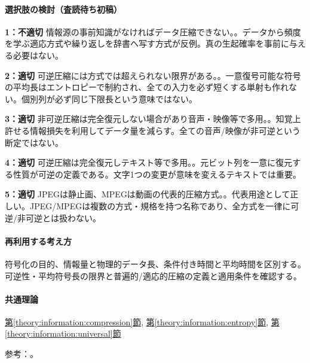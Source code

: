 \paragraph{選択肢の検討（査読待ち初稿）}\mbox{}\par

\noindent\textbf{1：不適切} 情報源の事前知識がなければデータ圧縮できない。。データから頻度を学ぶ適応方式や繰り返しを辞書へ写す方式が反例。真の生起確率を事前に与える必要はない。\par

\noindent\textbf{2：適切} 可逆圧縮には方式では超えられない限界がある。。一意復号可能な符号の平均長はエントロピーで制約され、全ての入力を必ず短くする単射も作れない。個別列が必ず同じ下限長という意味ではない。\par

\noindent\textbf{3：適切} 非可逆圧縮は完全復元しない場合があり音声・映像等で多用。。知覚上許せる情報損失を利用してデータ量を減らす。全ての音声/映像が非可逆という断定ではない。\par

\noindent\textbf{4：適切} 可逆圧縮は完全復元しテキスト等で多用。。元ビット列を一意に復元する性質が可逆の定義である。文字1つの変更が意味を変えるテキストでは重要。\par

\noindent\textbf{5：適切} JPEGは静止画、MPEGは動画の代表的圧縮方式。。代表用途として正しい。JPEG/MPEGは複数の方式・規格を持つ名称であり、全方式を一律に可逆/非可逆とは扱わない。\par

\paragraph{再利用する考え方} 符号化の目的、情報量と物理的データ長、条件付き時間と平均時間を区別する。可逆性・平均符号長の限界と普遍的/適応的圧縮の定義と適用条件を確認する。

\paragraph{共通理論} \hyperref[theory:information:compression]{第\ref*{theory:information:compression}節}, \hyperref[theory:information:entropy]{第\ref*{theory:information:entropy}節}, \hyperref[theory:information:universal]{第\ref*{theory:information:universal}節}

\par 参考：\cite{info_deflate,info_lossless,info_universal,info_jpeg,info_mpeg}。

